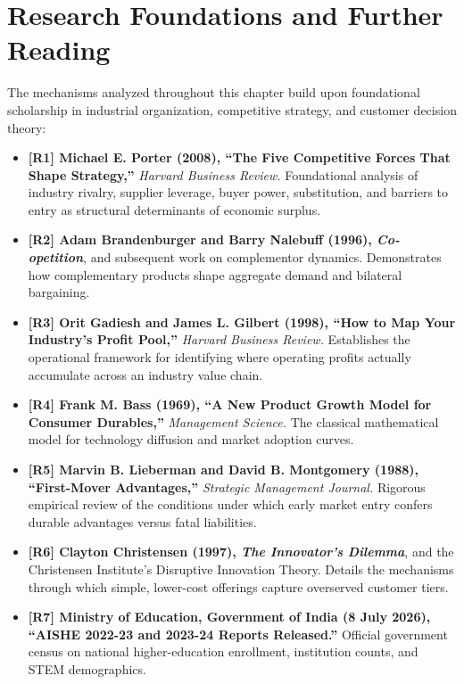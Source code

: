 \section*{Research Foundations and Further Reading}

The mechanisms analyzed throughout this chapter build upon foundational scholarship in industrial organization, competitive strategy, and customer decision theory:

\begin{itemize}[leftmargin=14pt,itemsep=3pt,topsep=2pt]
  \item \textbf{[R1] Michael E. Porter (2008), ``The Five Competitive Forces That Shape Strategy,''} \textit{Harvard Business Review.} Foundational analysis of industry rivalry, supplier leverage, buyer power, substitution, and barriers to entry as structural determinants of economic surplus.
  \item \textbf{[R2] Adam Brandenburger and Barry Nalebuff (1996), \textit{Co-opetition}}, and subsequent work on complementor dynamics. Demonstrates how complementary products shape aggregate demand and bilateral bargaining.
  \item \textbf{[R3] Orit Gadiesh and James L. Gilbert (1998), ``How to Map Your Industry's Profit Pool,''} \textit{Harvard Business Review.} Establishes the operational framework for identifying where operating profits actually accumulate across an industry value chain.
  \item \textbf{[R4] Frank M. Bass (1969), ``A New Product Growth Model for Consumer Durables,''} \textit{Management Science.} The classical mathematical model for technology diffusion and market adoption curves.
  \item \textbf{[R5] Marvin B. Lieberman and David B. Montgomery (1988), ``First-Mover Advantages,''} \textit{Strategic Management Journal.} Rigorous empirical review of the conditions under which early market entry confers durable advantages versus fatal liabilities.
  \item \textbf{[R6] Clayton Christensen (1997), \textit{The Innovator's Dilemma}}, and the Christensen Institute's Disruptive Innovation Theory. Details the mechanisms through which simple, lower-cost offerings capture overserved customer tiers.
  \item \textbf{[R7] Ministry of Education, Government of India (8 July 2026), ``AISHE 2022-23 and 2023-24 Reports Released.''} Official government census on national higher-education enrollment, institution counts, and STEM demographics.

\end{itemize}
